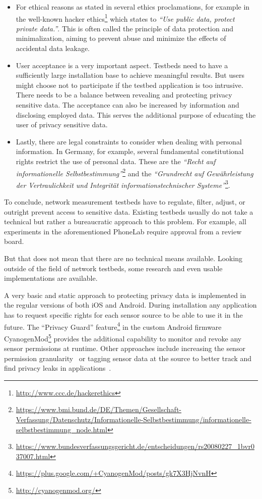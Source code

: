 \begin{itemize}

	\item For ethical reasons as stated in several ethics proclamations, for example in the well-known hacker ethics\footnote{\url{http://www.ccc.de/hackerethics}} which states to \textit{``Use public data, protect private data.''}. This is often called the principle of data protection and minimalization, aiming to prevent abuse and minimize the effects of accidental data leakage.

	\item User acceptance is a very important aspect. Testbeds need to have a sufficiently large installation base to achieve meaningful results. But users might choose not to participate if the testbed application is too intrusive. There needs to be a balance between revealing and protecting privacy sensitive data. The acceptance can also be increased by information and disclosing employed data. This serves the additional purpose of educating the user of privacy sensitive data.

	\item Lastly, there are legal constraints to consider when dealing with personal information. In Germany, for example, several fundamental constitutional rights restrict the use of personal data. These are the \textit{``Recht auf informationelle Selbstbestimmung''}\footnote{\url{https://www.bmi.bund.de/DE/Themen/Gesellschaft-Verfassung/Datenschutz/Informationelle-Selbstbestimmung/informationelle-selbstbestimmung_node.html}} and the \textit{``Grundrecht auf Gewährleistung der Vertraulichkeit und Integrität informationstechnischer Systeme''}\footnote{\url{https://www.bundesverfassungsgericht.de/entscheidungen/rs20080227_1bvr037007.html}}.

\end{itemize}

To conclude, network measurement testbeds have to regulate, filter, adjust, or outright prevent access to sensitive data. Existing testbeds usually do not take a technical but rather a bureaucratic approach to this problem. For example, all experiments in the aforementioned PhoneLab require approval from a review board.

But that does not mean that there are no technical means available. Looking outside of the field of network testbeds, some research and even usable implementations are available. 

A very basic and static approach to protecting privacy data is implemented in the regular versions of both iOS and Android. During installation any application has to request specific rights for each sensor source to be able to use it in the future. The ``Privacy Guard'' feature\footnote{\url{https://plus.google.com/+CyanogenMod/posts/gk7X3HjNvnH}} in the custom Android firmware CyanogenMod\footnote{\url{http://cyanogenmod.org/}} provides the additional capability to monitor and revoke any sensor permissions at runtime. Other approaches include increasing the sensor permission granularity~\cite{Jeon:2012:DAM:2381934.2381938} or tagging sensor data at the source to better track and find privacy leaks in applications~\cite{enck2010taintdroid}.


